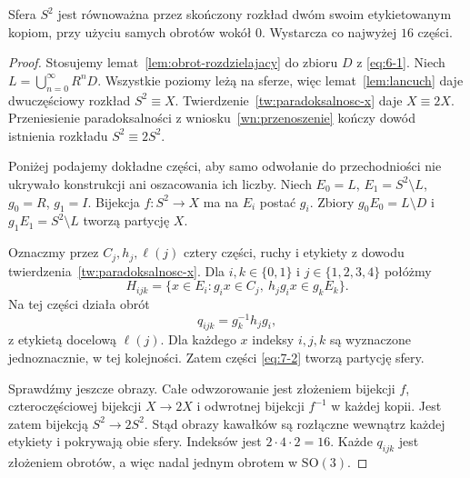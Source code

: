 \begin{twierdzenie}\label{tw:pelna-sfera}
Sfera $S^2$ jest równoważna przez skończony rozkład dwóm swoim etykietowanym kopiom, przy użyciu samych obrotów wokół $0$. Wystarcza co najwyżej $16$ części.
\end{twierdzenie}
\begin{proof}
Stosujemy lemat~\ref{lem:obrot-rozdzielajacy} do zbioru $D$ z \eqref{eq:6-1}. Niech $L=\bigcup_{n=0}^\infty R^nD$. Wszystkie poziomy leżą na sferze, więc lemat~\ref{lem:lancuch} daje dwuczęściowy rozkład $S^2\equiv X$. Twierdzenie~\ref{tw:paradoksalnosc-x} daje $X\equiv2X$. Przeniesienie paradoksalności z wniosku~\ref{wn:przenoszenie} kończy dowód istnienia rozkładu $S^2\equiv2S^2$.

Poniżej podajemy dokładne części, aby samo odwołanie do przechodniości nie ukrywało konstrukcji ani oszacowania ich liczby. Niech $E_0=L$, $E_1=S^2\setminus L$, $g_0=R$, $g_1=I$. Bijekcja $f:S^2\to X$ ma na $E_i$ postać $g_i$. Zbiory $g_0E_0=L\setminus D$ i $g_1E_1=S^2\setminus L$ tworzą partycję $X$.

Oznaczmy przez $C_j,h_j,\ell(j)$ cztery części, ruchy i etykiety z dowodu twierdzenia~\ref{tw:paradoksalnosc-x}. Dla $i,k\in\{0,1\}$ i $j\in\{1,2,3,4\}$ połóżmy
\begin{equation}\label{eq:7-2}
 H_{ijk}=\{x\in E_i:g_ix\in C_j,\ h_jg_ix\in g_kE_k\}.
\end{equation}
Na tej części działa obrót
\begin{equation}\label{eq:7-3}
 q_{ijk}=g_k^{-1}h_jg_i,
\end{equation}
z etykietą docelową $\ell(j)$. Dla każdego $x$ indeksy $i,j,k$ są wyznaczone jednoznacznie, w tej kolejności. Zatem części \eqref{eq:7-2} tworzą partycję sfery.

Sprawdźmy jeszcze obrazy. Całe odwzorowanie jest złożeniem bijekcji $f$, czteroczęściowej bijekcji $X\to2X$ i odwrotnej bijekcji $f^{-1}$ w każdej kopii. Jest zatem bijekcją $S^2\to2S^2$. Stąd obrazy kawałków są rozłączne wewnątrz każdej etykiety i pokrywają obie sfery. Indeksów jest $2\cdot4\cdot2=16$. Każde $q_{ijk}$ jest złożeniem obrotów, a więc nadal jednym obrotem w $\mathrm{SO}(3)$.
\end{proof}

